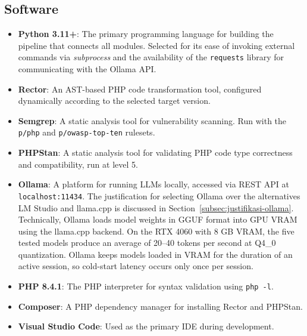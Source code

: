 \subsection{Software}

\begin{itemize}

    \item \textbf{Python 3.11+}: The primary programming language for building the pipeline that connects all modules. Selected for its ease of invoking external commands via \textit{subprocess} and the availability of the \texttt{requests} library for communicating with the Ollama API.

    \item \textbf{Rector}: An AST-based PHP code transformation tool, configured dynamically according to the selected target version.

    \item \textbf{Semgrep}: A static analysis tool for vulnerability scanning. Run with the \texttt{p/php} and \texttt{p/owasp-top-ten} rulesets.

    \item \textbf{PHPStan}: A static analysis tool for validating PHP code type correctness and compatibility, run at level 5.

    \item \textbf{Ollama}: A platform for running LLMs locally, accessed via REST API at \texttt{localhost:11434}. The justification for selecting Ollama over the alternatives LM Studio and llama.cpp is discussed in Section~\ref{subsec:justifikasi-ollama}. Technically, Ollama loads model weights in GGUF format into GPU VRAM using the llama.cpp backend. On the RTX 4060 with 8 GB VRAM, the five tested models produce an average of 20--40 tokens per second at Q4\_0 quantization. Ollama keeps models loaded in VRAM for the duration of an active session, so cold-start latency occurs only once per session.

    \item \textbf{PHP 8.4.1}: The PHP interpreter for syntax validation using \texttt{php -l}.

    \item \textbf{Composer}: A PHP dependency manager for installing Rector and PHPStan.

    \item \textbf{Visual Studio Code}: Used as the primary IDE during development.

\end{itemize}

